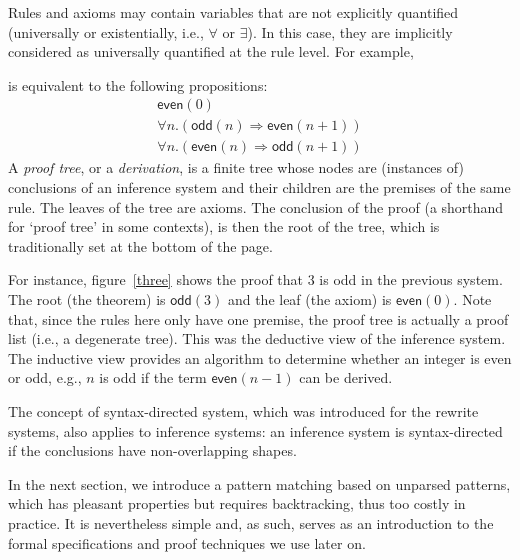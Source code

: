 Rules and axioms may contain variables that are not explicitly
quantified (universally or existentially, i.e., \(\forall\) or
\(\exists\)). In this case, they are implicitly considered as
universally quantified at the rule level. For example,
is equivalent to the following propositions:
\begin{gather*}
\textsf{even}(0)\\
\forall n.(\textsf{odd}(n) \Rightarrow \textsf{even}(n+1))\\
\forall n.(\textsf{even}(n) \Rightarrow \textsf{odd}(n+1))
\end{gather*}
A \emph{proof tree}, or a \emph{derivation}, is a finite tree whose
nodes are (instances of) conclusions of an inference system and their
children are the premises of the same rule. The leaves of the tree are
axioms. The conclusion of the proof (a shorthand for `proof tree' in
some contexts), is then the root of the tree, which is traditionally
set at the bottom of the page.

\piccaption{\label{three}}
\smallskip
{}

\noindent For instance, figure~\ref{three} shows the proof that \(3\)
is odd in the previous system. The root (the theorem) is
\(\textsf{odd}(3)\) and the leaf (the axiom) is
\(\textsf{even}(0)\). Note that, since the rules here only have one
premise, the proof tree is actually a proof list (i.e., a degenerate
tree). This was the deductive view of the inference system. The
inductive view provides an algorithm to determine whether an integer
is even or odd, e.g., \(n\) is odd if the term \(\textsf{even}(n-1)\)
can be derived.

The concept of syntax\hyp{}directed system, which was introduced for
the rewrite systems, also applies to inference systems: an inference
system is syntax\hyp{}directed if the conclusions have
non\hyp{}overlapping shapes.

In the next section, we introduce a pattern matching based on unparsed
patterns, which has pleasant properties but requires backtracking,
thus too costly in practice. It is nevertheless simple and, as such,
serves as an introduction to the formal specifications and proof
techniques we use later on.
